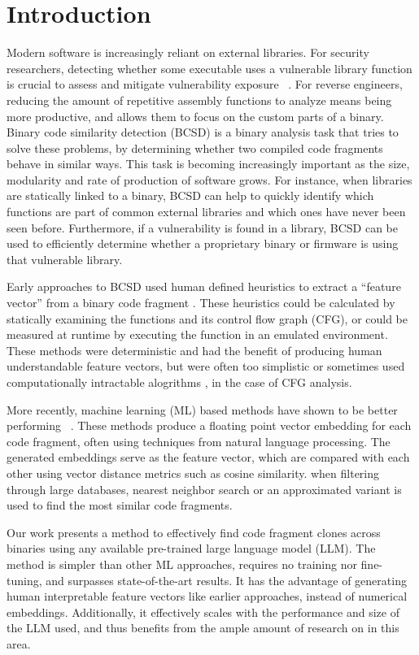 \section{Introduction}

Modern software is increasingly reliant on external libraries.
For security researchers, detecting whether some executable uses a vulnerable library function is crucial to assess
and mitigate vulnerability exposure ~\cite{BCSD, BCSDsurvey}. For reverse engineers, reducing the amount of repetitive assembly functions
to analyze means being more productive, and allows them to focus on the custom parts of a binary.  Binary code similarity
detection (BCSD) is a binary analysis task that tries to solve these problems, by determining whether two compiled
code fragments behave in similar ways. This task is becoming increasingly important as the size, modularity and rate of
production of software grows. For instance, when libraries are statically linked to a binary, BCSD can help to
quickly identify which functions are part of common external libraries and which ones have never been seen before.
Furthermore, if a vulnerability is found in a library, BCSD can be used to efficiently determine whether a proprietary
binary or firmware is using that vulnerable library.

Early approaches to BCSD used human defined heuristics to extract a ``feature vector'' from a binary code fragment \cite{op-seq, BinDiff, clones.net}.
These heuristics could be calculated by statically examining the functions and its control flow graph (CFG), or could be measured at runtime
by executing the function in an emulated environment. These methods were deterministic and had the benefit of producing
human understandable feature vectors, but were often too simplistic \cite{op-seq} or sometimes used computationally intractable alogrithms \cite{BinDiff}, in
the case of CFG analysis.

More recently, machine learning (ML) based methods have shown to be better performing ~\cite{SAFE,PalmTree,OrderMatters,Asm2Vec,CLAP}.
These methods produce a floating point vector embedding for each code fragment, often using techniques from
natural language processing. The generated embeddings serve as the feature vector, which are compared
with each other using vector distance metrics such as cosine similarity. when filtering through large databases,
nearest neighbor search or an approximated variant is used to find the most similar code fragments.

Our work presents a method to effectively find code fragment clones across binaries using any available pre-trained
large language model (LLM). The method is simpler than other ML approaches, requires no training nor fine-tuning, and
surpasses state-of-the-art results. It has the advantage of generating human interpretable feature vectors like earlier approaches,
instead of numerical embeddings. Additionally, it effectively scales with the performance and size of the LLM used, and thus
benefits from the ample amount of research on in this area.

